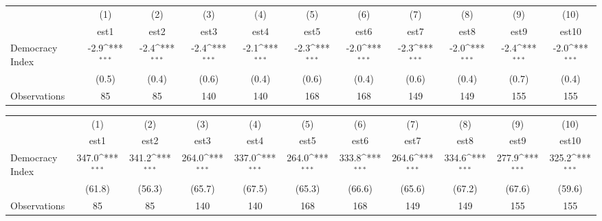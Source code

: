 {
\def\sym#1{\ifmmode^{#1}\else\(^{#1}\)\fi}
\begin{tabular}{l*{10}{c}}
                &\multicolumn{1}{c}{(1)}         &\multicolumn{1}{c}{(2)}         &\multicolumn{1}{c}{(3)}         &\multicolumn{1}{c}{(4)}         &\multicolumn{1}{c}{(5)}         &\multicolumn{1}{c}{(6)}         &\multicolumn{1}{c}{(7)}         &\multicolumn{1}{c}{(8)}         &\multicolumn{1}{c}{(9)}         &\multicolumn{1}{c}{(10)}         \\
                &     est1         &     est2         &     est3         &     est4         &     est5         &     est6         &     est7         &     est8         &     est9         &    est10         \\
Democracy Index &     -2.9\sym{***}&     -2.4\sym{***}&     -2.4\sym{***}&     -2.1\sym{***}&     -2.3\sym{***}&     -2.0\sym{***}&     -2.3\sym{***}&     -2.0\sym{***}&     -2.4\sym{***}&     -2.0\sym{***}\\
                &    (0.5)         &    (0.4)         &    (0.6)         &    (0.4)         &    (0.6)         &    (0.4)         &    (0.6)         &    (0.4)         &    (0.7)         &    (0.4)         \\
Observations    &       85         &       85         &      140         &      140         &      168         &      168         &      149         &      149         &      155         &      155         \\
\end{tabular}
}
{
\def\sym#1{\ifmmode^{#1}\else\(^{#1}\)\fi}
\begin{tabular}{l*{10}{c}}
                &\multicolumn{1}{c}{(1)}         &\multicolumn{1}{c}{(2)}         &\multicolumn{1}{c}{(3)}         &\multicolumn{1}{c}{(4)}         &\multicolumn{1}{c}{(5)}         &\multicolumn{1}{c}{(6)}         &\multicolumn{1}{c}{(7)}         &\multicolumn{1}{c}{(8)}         &\multicolumn{1}{c}{(9)}         &\multicolumn{1}{c}{(10)}         \\
                &     est1         &     est2         &     est3         &     est4         &     est5         &     est6         &     est7         &     est8         &     est9         &    est10         \\
Democracy Index &    347.0\sym{***}&    341.2\sym{***}&    264.0\sym{***}&    337.0\sym{***}&    264.0\sym{***}&    333.8\sym{***}&    264.6\sym{***}&    334.6\sym{***}&    277.9\sym{***}&    325.2\sym{***}\\
                &   (61.8)         &   (56.3)         &   (65.7)         &   (67.5)         &   (65.3)         &   (66.6)         &   (65.6)         &   (67.2)         &   (67.6)         &   (59.6)         \\
Observations    &       85         &       85         &      140         &      140         &      168         &      168         &      149         &      149         &      155         &      155         \\
\end{tabular}
}
